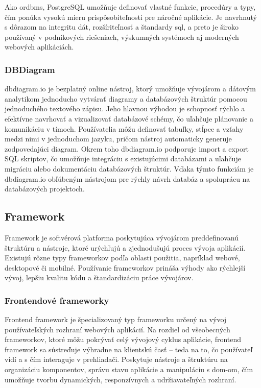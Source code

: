 Ako \acrshort{ordbms}, PostgreSQL umožňuje definovať vlastné funkcie, procedúry a typy, čím ponúka vysokú mieru prispôsobiteľnosti pre náročné aplikácie. 
Je navrhnutý s dôrazom na integritu dát, rozšíriteľnosť a štandardy \acrshort{sql}, a preto je široko používaný v podnikových riešeniach, výskumných systémoch aj moderných webových aplikáciách.\cite{postgre}
\subsubsection{DBDiagram}
dbdiagram.io je bezplatný online nástroj, ktorý umožňuje vývojárom a dátovým analytikom jednoducho vytvárať diagramy a databázových štruktúr pomocou jednoduchého textového zápisu.
Jeho hlavnou výhodou je schopnosť rýchlo a efektívne navrhovať a vizualizovať databázové schémy, čo uľahčuje plánovanie a komunikáciu v tímoch.
 Používatelia môžu definovať tabuľky, stĺpce a vzťahy medzi nimi v jednoduchom jazyku, pričom nástroj automaticky generuje zodpovedajúci diagram.
  Okrem toho dbdiagram.io podporuje import a export SQL skriptov, čo umožňuje integráciu s existujúcimi databázami a uľahčuje migráciu alebo dokumentáciu databázových štruktúr.
 Vďaka týmto funkciám je dbdiagram.io obľúbeným nástrojom pre rýchly návrh databáz a spoluprácu na databázových projektoch.
\subsection{Framework}
Framework je softvérová platforma poskytujúca vývojárom preddefinovanú štruktúru a nástroje, ktoré urýchľujú a zjednodušujú proces vývoja aplikácií.
 Existujú rôzne typy frameworkov podľa oblasti použitia, napríklad webové, desktopové či mobilné.
 Používanie frameworkov prináša výhody ako rýchlejší vývoj, lepšiu kvalitu kódu a štandardizáciu práce vývojárov. \cite{framework}
\subsubsection{Frontendové frameworky}
Frontend framework je špecializovaný typ frameworku určený na vývoj používateľských rozhraní webových aplikácií.
 Na rozdiel od všeobecných frameworkov, ktoré môžu pokrývať celý vývojový cyklus aplikácie, frontend framework sa sústreďuje výhradne na klientskú časť – teda na to, čo používateľ vidí a s čím interaguje v prehliadači.
  Poskytuje nástroje a štruktúru na organizáciu komponentov, správu stavu aplikácie a manipuláciu s \acrshort{dom}-om, čím umožňuje tvorbu dynamických, responzívnych a udržiavateľných rozhraní.

